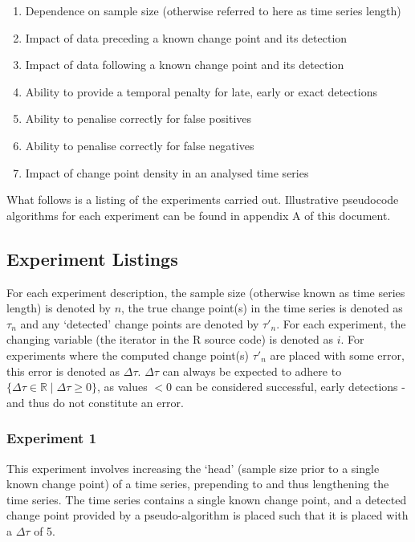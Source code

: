 \documentclass{uvamscse}	%
\begin{document}
\begin{enumerate}
    \item Dependence on sample size (otherwise referred to here as time series length)
    \item Impact of data preceding a known change point and its detection
    \item Impact of data following a known change point and its detection
    \item Ability to provide a temporal penalty for late, early or exact detections
    \item Ability to penalise correctly for false positives
    \item Ability to penalise correctly for false negatives
    \item Impact of change point density in an analysed time series
\end{enumerate}

What follows is a listing of the experiments carried out. Illustrative pseudocode algorithms for each experiment can be found in appendix A of this document.

\subsection{Experiment Listings}

For each experiment description, the sample size (otherwise known as time series length) is denoted by $n$, the true change point(s) in the time series is denoted as $\tau_n$ and any `detected' change points are denoted by $\tau'_{n}$. For each experiment, the changing variable (the iterator in the \textsf{R} source code) is denoted as $i$. For experiments where the computed change point(s) $\tau'_n$ are placed with some error, this error is denoted as $\Delta \tau$. $\Delta \tau$ can always be expected to adhere to $\{ \Delta \tau \in \mathbb{R} \mid \Delta \tau \geq 0 \}$, as values $< 0$ can be considered successful, early detections - and thus do not constitute an error.

\subsubsection{Experiment 1}

This experiment involves increasing the `head' (sample size prior to a single known change point) of a time series, prepending to and thus lengthening the time series. The time series contains a single known change point, and a detected change point provided by a pseudo-algorithm is placed such that it is placed with a $\Delta \tau$ of 5.
\end{document}

